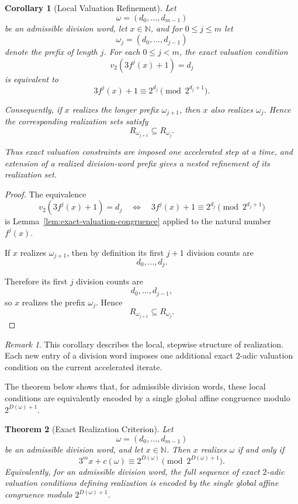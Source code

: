 \documentclass[12pt, oneside]{article}
\numberwithin{equation}{section}
\theoremstyle{definition}
\theoremstyle{plain}
\newtheorem{theorem}{Theorem}[section]
\newtheorem{corollary}[theorem]{Corollary}
\theoremstyle{remark}
\newtheorem*{remark}{Remark}
\begin{document}
\begin{corollary}[Local Valuation Refinement]
\label{cor:local-refinement}
Let
\[
\omega=(d_0,\dots,d_{m-1})
\]
be an admissible division word, let \(x\in\mathbb N\), and for
\(0\le j\le m\) let
\[
\omega_j=(d_0,\dots,d_{j-1})
\]
denote the prefix of length \(j\).
For each \(0\le j<m\), the exact valuation condition
\[
v_2\!\left(3f^j(x)+1\right)=d_j
\]
is equivalent to
\[
3f^j(x)+1 \equiv 2^{d_j} \pmod{2^{d_j+1}}.
\]

Consequently, if \(x\) realizes the longer prefix
\(\omega_{j+1}\), then \(x\) also realizes \(\omega_j\). Hence the
corresponding realization sets satisfy
\[
R_{\omega_{j+1}} \subseteq R_{\omega_j}.
\]

Thus exact valuation constraints are imposed one accelerated step at a
time, and extension of a realized division-word prefix gives a nested
refinement of its realization set.
\end{corollary}

\begin{proof}
The equivalence
\[
v_2\!\left(3f^j(x)+1\right)=d_j \quad\Longleftrightarrow\quad
3f^j(x)+1 \equiv 2^{d_j} \pmod{2^{d_j+1}}
\]
is Lemma~\ref{lem:exact-valuation-congruence} applied to the natural
number \(f^j(x)\).

If \(x\) realizes \(\omega_{j+1}\), then by definition its first
\(j+1\) division counts are
\[
d_0,\dots,d_j.
\]

Therefore its first \(j\) division counts are
\[
d_0,\dots,d_{j-1},
\]
so \(x\) realizes the prefix \(\omega_j\). Hence
\[
R_{\omega_{j+1}}\subseteq R_{\omega_j}.
\]
\end{proof}

\begin{remark}
This corollary describes the local, stepwise structure of realization.
Each new entry of a division word imposes one additional exact
\(2\)-adic valuation condition on the current accelerated iterate.

The theorem below shows that, for admissible division words, these local
conditions are equivalently encoded by a single global affine congruence
modulo \(2^{D(\omega)+1}\).
\end{remark}

\begin{theorem}[Exact Realization Criterion]
\label{thm:exact-realization-criterion}
Let
\[
\omega=(d_0,\dots,d_{m-1})
\]
be an admissible division word, and let \(x\in\mathbb N\). Then \(x\)
realizes \(\omega\) if and only if
\[
3^m x+c(\omega) \equiv 2^{D(\omega)} \pmod{2^{D(\omega)+1}}.
\]
Equivalently, for an admissible division word, the full sequence of exact
\(2\)-adic valuation conditions defining realization is encoded by the
single global affine congruence modulo \(2^{D(\omega)+1}\).
\end{theorem}
\end{document}
